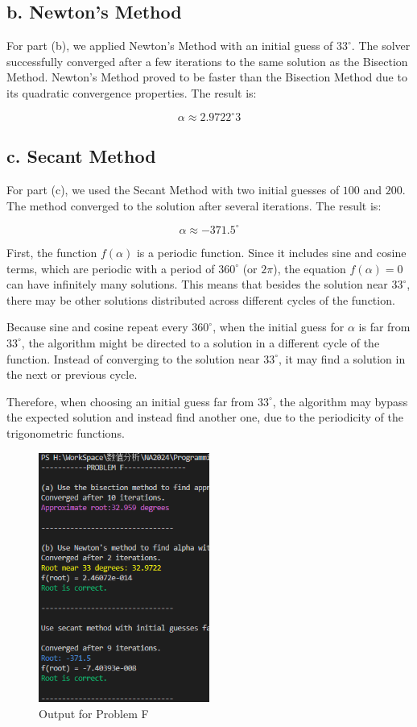 \documentclass[a4paper]{article}
\begin{document}
\subsection* {b. Newton's Method}
For part (b), we applied Newton's Method with an initial guess of \( 33^\circ \). The solver successfully converged after a few iterations to the same solution as the Bisection Method. Newton's Method proved to be faster than the Bisection Method due to its quadratic convergence properties. The result is:

\[
\alpha \approx 2.9722^\circ3
\]

\subsection* {c. Secant Method}
For part (c), we used the Secant Method with two initial guesses of \( 100 \) and \( 200 \). The method converged to the solution after several iterations. The result is:

\[
\alpha \approx -371.5^\circ
\]

First, the function \( f(\alpha) \) is a periodic function. Since it includes sine and cosine terms, which are periodic with a period of \( 360^\circ \) (or \( 2\pi \)), the equation \( f(\alpha) = 0 \) can have infinitely many solutions. This means that besides the solution near \( 33^\circ \), there may be other solutions distributed across different cycles of the function.

Because sine and cosine repeat every \( 360^\circ \), when the initial guess for \( \alpha \) is far from \( 33^\circ \), the algorithm might be directed to a solution in a different cycle of the function. Instead of converging to the solution near \( 33^\circ \), it may find a solution in the next or previous cycle.

Therefore, when choosing an initial guess far from \( 33^\circ \), the algorithm may bypass the expected solution and instead find another one, due to the periodicity of the trigonometric functions.

\begin{figure}[H]  %
  \centering
  \includegraphics[width=0.5\textwidth]{./picture/ProblemF.png}
  \caption{Output for Problem F}
\end{figure}
\end{document}
